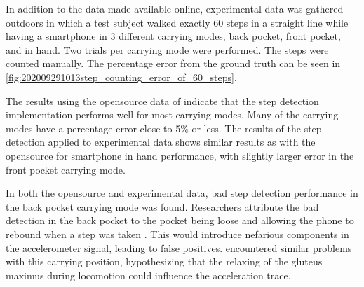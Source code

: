 In addition to the data made available online, experimental data was gathered outdoors in which a test subject walked exactly 60 steps in a straight line while having a smartphone in 3 different carrying modes, back pocket, front pocket, and in hand. Two trials per carrying mode were performed. The steps were counted manually. The percentage error from the ground truth can be seen in \cref{fig:202009291013step_counting_error_of_60_steps}.

The results using the opensource data of \citet{Salvi2018} indicate that the step detection implementation performs well for most carrying modes. Many of the carrying modes have a percentage error close to 5\% or less. The results of the step detection applied to experimental data shows similar results as with the opensource for smartphone in hand performance, with slightly larger error in the front pocket carrying mode.\par 

In both the opensource and experimental data, bad step detection performance in the back pocket carrying mode was found. Researchers attribute the bad detection in the back pocket to the pocket being loose and allowing the phone to rebound when a step was taken \cite{Salvi2018}. This would introduce nefarious components in the accelerometer signal, leading to false positives. \citet{Brajdic2013} encountered similar problems with this carrying position, hypothesizing that the relaxing of the gluteus maximus during locomotion could influence the acceleration trace.

